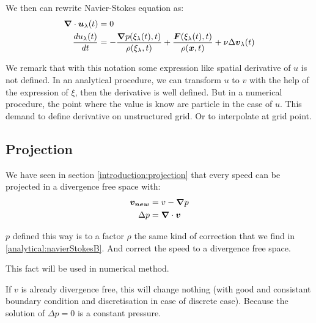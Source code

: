 We then can rewrite Navier-Stokes equation as:
\begin{align}
\label{analytical:navierStokesLagA}
{\boldsymbol {\nabla}} \cdot {\boldsymbol {u}}_{\lambda}(t)&=0\\
\label{analytical:navierStokesLagB}
\frac{d u_{\lambda}(t)}{d t}&=-\frac{{\boldsymbol {\nabla}} p(\xi_{\lambda}(t),t)}{\rho(\xi_{\lambda},t)}+\frac{{\boldsymbol {F}}(\xi_{\lambda}(t),t)}{\rho({\boldsymbol {x}},t)}+\nu \Delta {\boldsymbol {v}}_{\lambda}(t)
\end{align}

\begin{rem}
We remark that with this notation some expression like spatial derivative of $u$ is not defined.
In an analytical procedure, we can transform $u$ to $v$ with the help of the expression of $\xi$, then the derivative is well defined.
But in a numerical procedure, the point where the value is know are particle in the case of $u$. This demand to define derivative on unstructured grid.
Or to interpolate at grid point.
\end{rem}

\subsection{Projection}

We have seen in section \ref{introduction:projection} that every speed can be projected in a divergence free space with:
\begin{align}
 {\boldsymbol {v_{new}}}&=v-{\boldsymbol {\nabla}}p\\
 \Delta p&={\boldsymbol {\nabla}} \cdot {\boldsymbol {v}}
\end{align}

$p$ defined this way is to a factor $\rho$ the same kind of correction that we find in \ref{analytical:navierStokesB}.
And correct the speed to a divergence free space.

This fact will be used in numerical method.

If $v$ is already divergence free, this will change nothing (with good and consistant boundary condition and discretisation in case of discrete case).
Because the solution of $\Delta p=0$ is a constant pressure.


